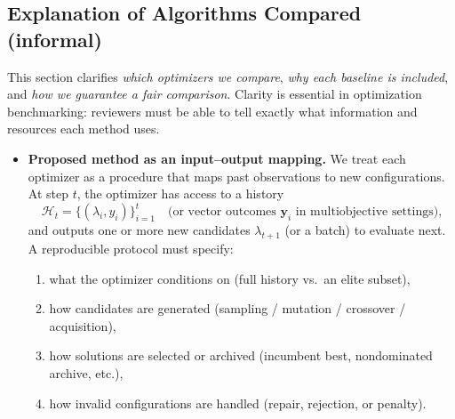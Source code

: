 \subsection*{Explanation of Algorithms Compared (informal)}
This section clarifies \emph{which optimizers we compare}, \emph{why each baseline is included}, and \emph{how we guarantee a fair comparison}.
Clarity is essential in optimization benchmarking: reviewers must be able to tell exactly what information and resources each method uses.

\begin{itemize}
    \item \textbf{Proposed method as an input--output mapping.}
    We treat each optimizer as a procedure that maps past observations to new configurations.
    At step \(t\), the optimizer has access to a history
    \[
        \mathcal{H}_t = \{(\lambda_i, y_i)\}_{i=1}^{t}
        \quad \text{(or vector outcomes \(\mathbf{y}_i\) in multiobjective settings),}
    \]
    and outputs one or more new candidates \(\lambda_{t+1}\) (or a batch) to evaluate next.
    A reproducible protocol must specify:
    \begin{enumerate}
        \item what the optimizer conditions on (full history vs.\ an elite subset),
        \item how candidates are generated (sampling / mutation / crossover / acquisition),
        \item how solutions are selected or archived (incumbent best, nondominated archive, etc.),
        \item how invalid configurations are handled (repair, rejection, or penalty).
    \end{enumerate}


\end{itemize}
